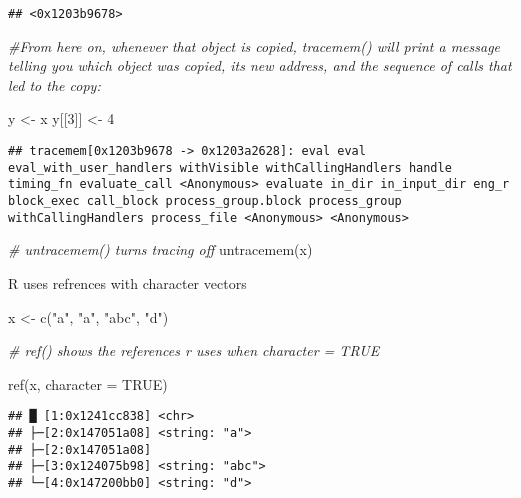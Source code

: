 \documentclass[
]{article}
\newenvironment{Shaded}{\begin{snugshade}}{\end{snugshade}}
\newcommand{\AttributeTok}[1]{\textcolor[rgb]{0.77,0.63,0.00}{#1}}
\newcommand{\CommentTok}[1]{\textcolor[rgb]{0.56,0.35,0.01}{\textit{#1}}}
\newcommand{\ConstantTok}[1]{\textcolor[rgb]{0.00,0.00,0.00}{#1}}
\newcommand{\DecValTok}[1]{\textcolor[rgb]{0.00,0.00,0.81}{#1}}
\newcommand{\FunctionTok}[1]{\textcolor[rgb]{0.00,0.00,0.00}{#1}}
\newcommand{\NormalTok}[1]{#1}
\newcommand{\OtherTok}[1]{\textcolor[rgb]{0.56,0.35,0.01}{#1}}
\newcommand{\StringTok}[1]{\textcolor[rgb]{0.31,0.60,0.02}{#1}}
\begin{document}
\begin{verbatim}
## <0x1203b9678>
\end{verbatim}

\begin{Shaded}
\begin{Highlighting}[]
\CommentTok{\#From here on, whenever that object is copied, \textasciigrave{}tracemem()\textasciigrave{} will print a message telling you which object was copied, its new address, and the sequence of calls that led to the copy:}

\NormalTok{y }\OtherTok{\textless{}{-}}\NormalTok{ x}
\NormalTok{y[[}\DecValTok{3}\NormalTok{]] }\OtherTok{\textless{}{-}} \DecValTok{4}
\end{Highlighting}
\end{Shaded}

\begin{verbatim}
## tracemem[0x1203b9678 -> 0x1203a2628]: eval eval eval_with_user_handlers withVisible withCallingHandlers handle timing_fn evaluate_call <Anonymous> evaluate in_dir in_input_dir eng_r block_exec call_block process_group.block process_group withCallingHandlers process_file <Anonymous> <Anonymous>
\end{verbatim}

\begin{Shaded}
\begin{Highlighting}[]
\CommentTok{\# \textasciigrave{}untracemem()\textasciigrave{} turns tracing off}
\FunctionTok{untracemem}\NormalTok{(x)}
\end{Highlighting}
\end{Shaded}

R uses refrences with character vectors

\begin{Shaded}
\begin{Highlighting}[]
\NormalTok{x }\OtherTok{\textless{}{-}} \FunctionTok{c}\NormalTok{(}\StringTok{"a"}\NormalTok{, }\StringTok{"a"}\NormalTok{, }\StringTok{"abc"}\NormalTok{, }\StringTok{"d"}\NormalTok{)}

\CommentTok{\# \textasciigrave{}ref()\textasciigrave{} shows the references r uses when \textasciigrave{}character = TRUE\textasciigrave{}}

\FunctionTok{ref}\NormalTok{(x, }\AttributeTok{character =} \ConstantTok{TRUE}\NormalTok{)}
\end{Highlighting}
\end{Shaded}

\begin{verbatim}
## █ [1:0x1241cc838] <chr> 
## ├─[2:0x147051a08] <string: "a"> 
## ├─[2:0x147051a08] 
## ├─[3:0x124075b98] <string: "abc"> 
## └─[4:0x147200bb0] <string: "d">
\end{verbatim}
\end{document}
